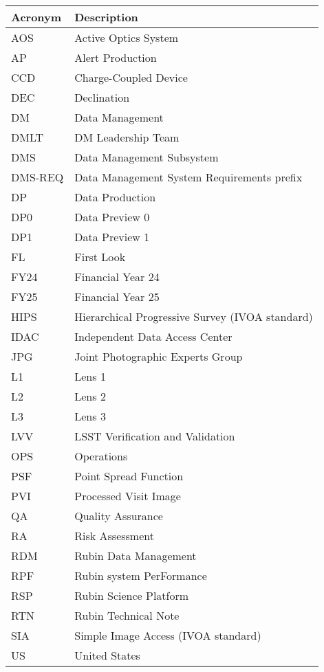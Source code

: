 \addtocounter{table}{-1}
\begin{longtable}{p{}p{}}\hline
\textbf{Acronym} & \textbf{Description}  \\\hline

AOS & Active Optics System \\\hline
AP & Alert Production \\\hline
CCD & Charge-Coupled Device \\\hline
DEC & Declination \\\hline
DM & Data Management \\\hline
DMLT & DM Leadership Team \\\hline
DMS & Data Management Subsystem \\\hline
DMS-REQ & Data Management System Requirements prefix \\\hline
DP & Data Production \\\hline
DP0 & Data Preview 0 \\\hline
DP1 & Data Preview 1 \\\hline
FL & First Look \\\hline
FY24 & Financial Year 24 \\\hline
FY25 & Financial Year 25 \\\hline
HIPS & Hierarchical Progressive Survey (IVOA standard) \\\hline
IDAC & Independent Data Access Center \\\hline
JPG & Joint Photographic Experts Group \\\hline
L1 & Lens 1 \\\hline
L2 & Lens 2 \\\hline
L3 & Lens 3 \\\hline
LVV & LSST Verification and Validation \\\hline
OPS & Operations \\\hline
PSF & Point Spread Function \\\hline
PVI & Processed Visit Image \\\hline
QA & Quality Assurance \\\hline
RA & Risk Assessment \\\hline
RDM & Rubin Data Management \\\hline
RPF & Rubin system PerFormance \\\hline
RSP & Rubin Science Platform \\\hline
RTN & Rubin Technical Note \\\hline
SIA & Simple Image Access (IVOA standard) \\\hline
US & United States \\\hline
\end{longtable}
